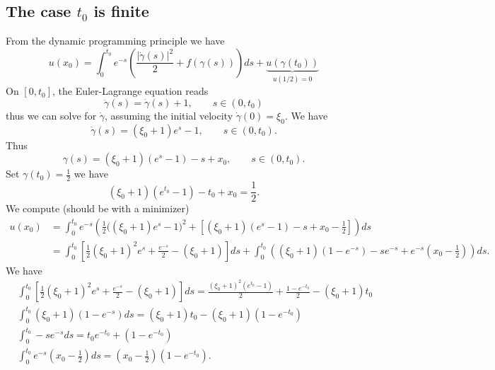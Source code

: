 \documentclass[english,reqno]{amsart}
\begin{document}
\subsection{The case $t_0$ is finite} From the dynamic programming principle we have
\begin{equation*}
    u(x_0) = \int_0^{t_0}e^{-s}\left(\frac{|\dot{\gamma}(s)|^2}{2} + f(\gamma(s))\right)ds + \underbrace{u(\gamma\left(t_0\right))}_{u(1/2) = 0}
\end{equation*}
On $[0,t_0]$, the Euler-Lagrange equation reads 
\begin{equation*}
    \ddot{\gamma}(s) = \dot{\gamma}(s)+1, \qquad s\in (0,t_0)
\end{equation*}
thus we can solve for $\dot{\gamma}$, assuming the initial velocity $\dot{\gamma}(0) = \xi_0$. We have
\begin{equation*}
    \dot{\gamma}(s) = (\xi_0+1)e^{s} - 1, \qquad s\in (0,t_0).
\end{equation*}
Thus
\begin{equation*}
    \gamma(s) = (\xi_0+1)(e^s-1) - s + x_0, \qquad s\in (0,t_0).
\end{equation*}
Set $\gamma(t_0) = \frac{1}{2}$ we have
\begin{equation*}
    (\xi_0+1)(e^{t_0}-1) - t_0 + x_0 = \frac{1}{2}.
\end{equation*}
We compute (should be with a minimizer)
\begin{equation*}
\begin{split}
    u(x_0) &= \int_0^{t_0}e^{-s}\left(\frac{1}{2}\Big((\xi_0+1)e^{s}-1\Big)^2 +\left[ (\xi_0+1)(e^{s}-1)-s+x_0 - \frac{1}{2}\right]\right)ds\\
    &=\int_0^{t_0}\left[\frac{1}{2}(\xi_0+1)^2e^{s}+\frac{e^{-s}}{2} - (\xi_0+1) \right]ds + \int_0^{t_0}\left((\xi_0+1)(1-e^{-s})-se^{-s} + e^{-s}\left(x_0-\frac{1}{2}\right)\right)ds.
\end{split}
\end{equation*}
We have
\begin{align*}
    &\int_0^{t_0}\left[\frac{1}{2}(\xi_0+1)^2e^{s}+\frac{e^{-s}}{2} - (\xi_0+1) \right]ds = \frac{(\xi_0+1)^2(e^{t_0}-1)}{2} + \frac{1-e^{-t_0}}{2} - (\xi_0+1)t_0 \\
    &\int_0^{t_0} (\xi_0+1)(1-e^{-s}) ds = (\xi_0+1)t_0 - (\xi_0+1)(1-e^{-t_0})\\
    &\int_0^{t_0} -se^{-s}ds = t_0e^{-t_0} + (1-e^{-t_0})\\
    &\int_0^{t_0} e^{-s}\left(x_0-\frac{1}{2}\right)ds = \left(x_0-\frac{1}{2}\right)(1-e^{-t_0}).
\end{align*}
\end{document}
